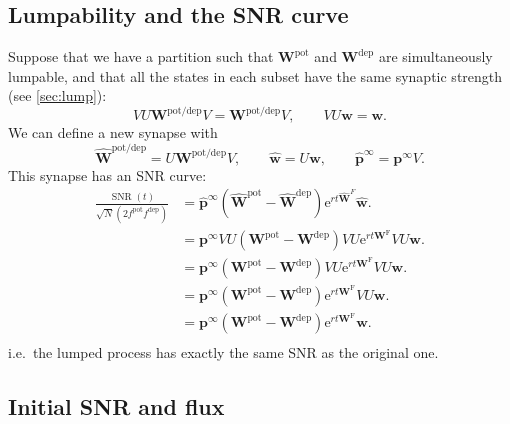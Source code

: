 \documentclass[9pt,twocolumn,twoside,lineno]{pnas-new}
\newcommand{\ie}{i.e.\ }
\newcommand{\e}{\mathrm{e}}
\DeclareMathOperator{\SNR}{SNR}
\newcommand{\prob}{\mathbf{p}}
\newcommand{\eq}{\prob^\infty}
\newcommand{\w}{\mathbf{w}}
\newcommand{\W}{\mathbf{W}}
\newcommand{\frg}{\W^{\mathrm{F}}}
\newcommand{\pot}{^{\text{pot}}}
\newcommand{\dep}{^{\text{dep}}}
\newcommand{\potdep}{^{\text{pot/dep}}}
\begin{document}
\begin{strip}
\subsection{Lumpability and the SNR curve}\label{sec:SNRlump}

Suppose that we have a partition such that $\W\pot $ and $\W\dep $ are simultaneously lumpable, and that all the states in each subset have the same synaptic strength (see \cref{sec:lump}):
%
\begin{equation}\label{eq:lumpablesynapse}
  VU\W\potdep  V = \W\potdep  V,
  \qquad
  VU\w=\w.
\end{equation}
%
We can define a new synapse with
%
\begin{equation}\label{eq:lumpedsynapse}
  \widehat{\W}\potdep  = U\W\potdep  V,
  \qquad
  \widehat{\w} = U \w,
  \qquad
  \widehat{\mathbf{p}}^\infty = \eq V.
\end{equation}
%
This synapse has an SNR curve:
%
\begin{equation}\label{eq:lumpedSNR}
  \begin{aligned}
    \frac{\SNR(t)}{\sqrt{N} (2f\pot f\dep )} &=  \widehat{\mathbf{p}}^\infty (\widehat{\W}\pot  - \widehat{\W}\dep )\e^{rt\widehat{\W}^F}\widehat{\w}. \\
      &= \eq VU (\W\pot  - \W\dep ) VU \e^{rt\frg} VU \w. \\
      &= \eq (\W\pot  - \W\dep ) VU \e^{rt\frg} VU \w. \\
      &= \eq (\W\pot  - \W\dep )\e^{rt\frg} VU \w. \\
      &= \eq (\W\pot  - \W\dep )\e^{rt\frg}\w. \\
  \end{aligned}
\end{equation}
%
\ie the lumped process has exactly the same SNR as the original one.


\subsection{Initial SNR and flux}\label{sec:initflux}


\end{strip}
\end{document}
